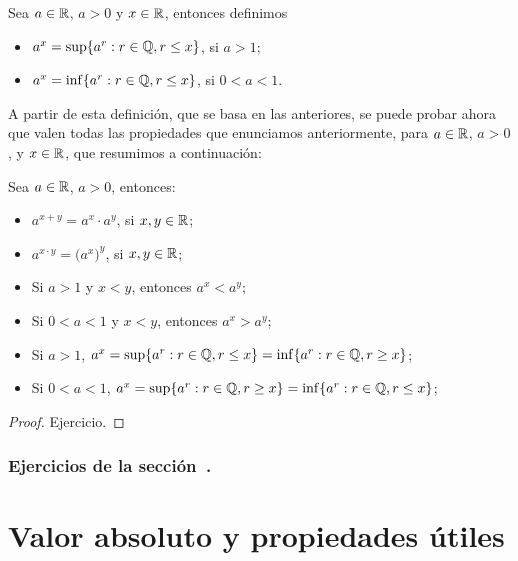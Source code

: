 \begin{definition}
    Sea $a\in\mathbb{R}$, $a>0$ y $x \in \mathbb{R}$, entonces definimos
    \begin{itemize}
        \item $a^x= \sup\{a^r: r\in\mathbb{Q}, r\le x\}$, si $a>1$;
        \item $a^x= \inf\{a^r: r\in\mathbb{Q}, r\le x\}$, si $0<a<1$.
    \end{itemize}
\end{definition}

A partir de esta definición, que se basa en las anteriores, se puede probar ahora que valen todas las propiedades que enunciamos anteriormente, para $a\in\mathbb{R}$, $a>0$, y $x\in\mathbb{R}$, que resumimos a continuación:

\begin{theorem}\label{T:exponencial propiedades}
    Sea $a\in\mathbb{R}$, $a>0$, entonces:
    \begin{itemize}
        \item $a^{x+y} = a^x \cdot a^y$, si $x,y\in\mathbb{R}$;
        \item $a^{x\cdot y} = \big(a^x\big)^y$, si $x,y\in\mathbb{R}$;
        \item Si $a>1$ y $x<y$, entonces $a^x < a^y$;
        \item Si $0<a<1$ y $x<y$, entonces $a^x > a^y$;
        \item Si $a>1$, $a^x= \sup\{a^r: r\in\mathbb{Q}, r\le x\} = \inf\{a^r: r\in\mathbb{Q}, r\ge x\}$;
        \item Si $0<a<1$, $a^x= \sup\{a^r: r\in\mathbb{Q}, r\ge x\} = \inf\{a^r: r\in\mathbb{Q}, r\le x\}$;
    \end{itemize}
\end{theorem}

\begin{proof}
    Ejercicio.
\end{proof}

\subsubsection*{Ejercicios de la sección~.}

\begin{enumerate}

\end{enumerate}

\section{Valor absoluto y propiedades útiles}

